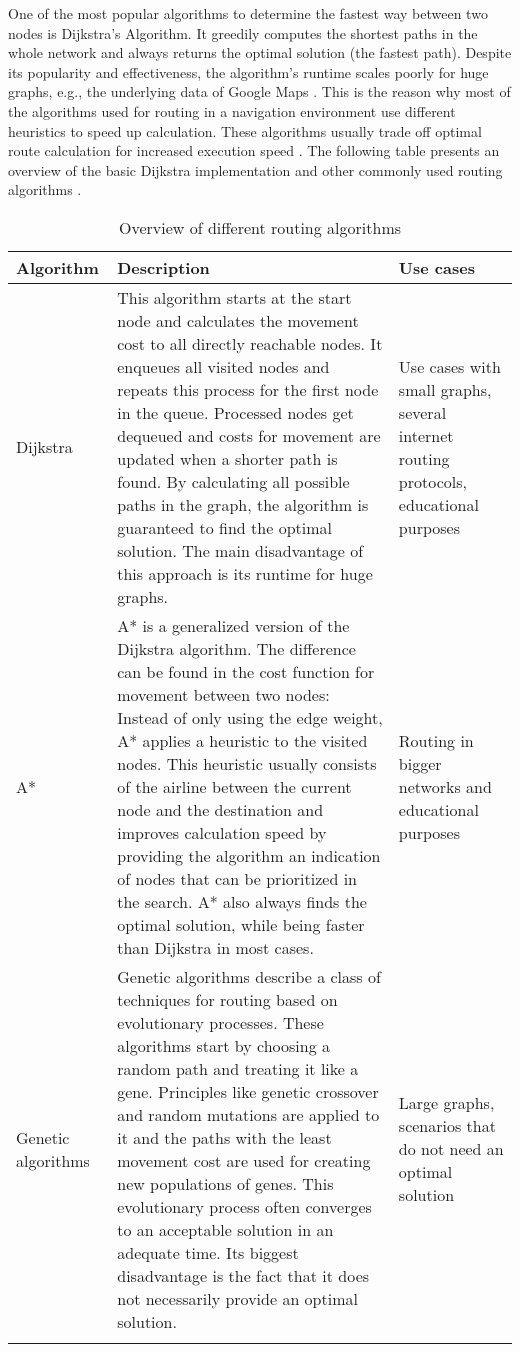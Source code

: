 One of the most popular algorithms to determine the fastest way between two nodes is Dijkstra's Algorithm. It greedily computes the shortest paths in the whole network and always returns the optimal solution (the fastest path). Despite its popularity and effectiveness, the algorithm's runtime scales poorly for huge graphs, e.g., the underlying data of Google Maps \cite{google_maps}. This is the reason why most of the algorithms used for routing in a navigation environment use different heuristics to speed up calculation. These algorithms usually trade off optimal route calculation for increased execution speed \cite{routing_algorithms}. The following table presents an overview of the basic Dijkstra implementation and other commonly used routing algorithms \cite{routing_algorithms}.

\begin{longtable}{|p{1.0in}|p{3.75in}|p{1.0in}|}
    \hline
    Algorithm & Description & Use cases\\
    \hline
    Dijkstra & This algorithm starts at the start node and calculates the movement cost to all directly reachable nodes. It enqueues all visited nodes and repeats this process for the first node in the queue. Processed nodes get dequeued and costs for movement are updated when a shorter path is found. By calculating all possible paths in the graph, the algorithm is guaranteed to find the optimal solution. The main disadvantage of this approach is its runtime for huge graphs. & Use cases with small graphs, several internet routing protocols, educational purposes\\
    \hline
    A* & A* is a generalized version of the Dijkstra algorithm. The difference can be found in the cost function for movement between two nodes: Instead of only using the edge weight, A* applies a heuristic to the visited nodes. This heuristic usually consists of the airline between the current node and the destination and improves calculation speed by providing the algorithm an indication of nodes that can be prioritized in the search. A* also always finds the optimal solution, while being faster than Dijkstra in most cases. & Routing in bigger networks and educational purposes\\
    \hline
    Genetic algorithms & Genetic algorithms describe a class of techniques for routing based on evolutionary processes. These algorithms start by choosing a random path and treating it like a gene. Principles like genetic crossover and random mutations are applied to it and the paths with the least movement cost are used for creating new populations of genes. This evolutionary process often converges to an acceptable solution in an adequate time. Its biggest disadvantage is the fact that it does not necessarily provide an optimal solution. & Large graphs, scenarios that do not need an optimal solution\\
    \hline
    \caption {Overview of different routing algorithms}
\end{longtable}

